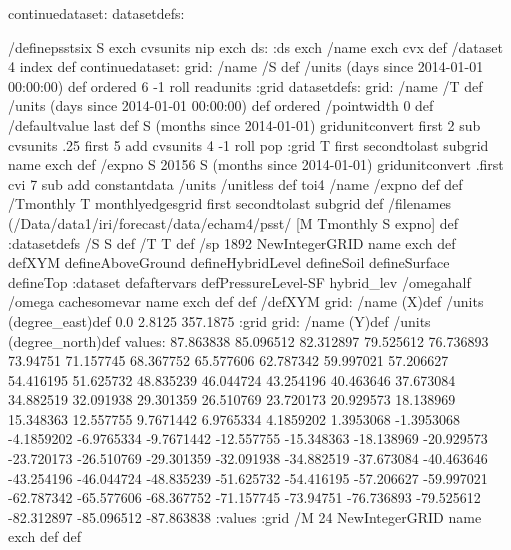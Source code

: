 \begin{ingrid}
continuedataset:
datasetdefs:
\end{ingrid}
\begin{ingrid}
/definepsstsix {
S exch cvsunits nip
exch
ds: :ds
exch /name exch cvx def
/dataset 4 index def
continuedataset:
grid: /name /S def /units (days since 2014-01-01 00:00:00) def ordered 
6 -1 roll 
readunits :grid
datasetdefs:
grid: /name /T def /units (days since 2014-01-01 00:00:00) def ordered
/pointwidth 0 def
/defaultvalue {last} def
S (months since 2014-01-01) gridunitconvert
first 2 sub cvsunits .25
first 5 add cvsunits
4 -1 roll pop
:grid
T first secondtolast subgrid name exch def
/expno 
S
20156 S (months since 2014-01-01) gridunitconvert .first cvi 7 sub add 
constantdata /units /unitless def toi4
/name /expno def
def
/Tmonthly T monthlyedgesgrid first secondtolast subgrid def
/filenames {
(/Data/data1/iri/forecast/data/echam4/psst/%
[M Tmonthly S expno]} def
:datasetdefs
/S S def
/T T def
/sp 1892 NewIntegerGRID name exch def
defXYM
defineAboveGround
defineHybridLevel
defineSoil
defineSurface
defineTop
:dataset
defaftervars
defPressureLevel-SF 
hybrid_lev /omegahalf /omega cachesomevar
name exch def
} def
/defXYM {
grid:
/name (X)def
/units (degree_east)def
 0.0 2.8125 357.1875
:grid
grid:
/name (Y)def
/units (degree_north)def
values: 87.863838 85.096512 82.312897 79.525612 76.736893 73.94751 71.157745 68.367752 65.577606 62.787342 59.997021 57.206627 54.416195 51.625732 48.835239 46.044724 43.254196 40.463646 37.673084 34.882519 32.091938 29.301359 26.510769 23.720173 20.929573 18.138969 15.348363 12.557755 9.7671442 6.9765334 4.1859202 1.3953068 -1.3953068 -4.1859202 -6.9765334 -9.7671442 -12.557755 -15.348363 -18.138969 -20.929573 -23.720173 -26.510769 -29.301359 -32.091938 -34.882519 -37.673084 -40.463646 -43.254196 -46.044724 -48.835239 -51.625732 -54.416195 -57.206627 -59.997021 -62.787342 -65.577606 -68.367752 -71.157745 -73.94751 -76.736893 -79.525612 -82.312897 -85.096512 -87.863838 :values
:grid
/M 24 NewIntegerGRID name exch def
} def
\end{ingrid}
